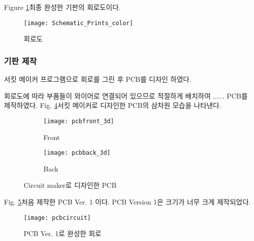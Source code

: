 Figure \ref{fig:Schematic_Prints}\는 최종 완성한 기판의 회로도이다.
\begin{figure}
	\begin{center}
	\texttt{[image: Schematic\_Prints\_color]}
	\caption{회로도}
	\label{fig:Schematic_Prints}
	\end{center}
\end{figure}


\subsubsection{기판 제작}
서킷 메이커 프로그램으로 회로를 그린 후 PCB를 디자인 하였다. 


회로도에 따라 부품들이 와이어로 연결되어 있으므로 적절하게 배치하여 ......    PCB를 제작하였다. Fig. \ref{fig:pcb}\은 서킷 메이커로 디자인한 PCB의 삼차원 모습을 나타낸다.

\begin{figure}[h]
	\begin{center}
	\begin{subfigure}{0.45\textwidth}
		\texttt{[image: pcbfront\_3d]} 
		\caption{Front}
		\label{fig:pcbfront_3d}
	\end{subfigure}
	\begin{subfigure}{0.45\textwidth}
		\texttt{[image: pcbback\_3d]}
		\caption{Back}
		\label{fig:pcbback_3d}
	\end{subfigure}
	\caption{Circuit maker로 디자인한 PCB}
	\label{fig:pcb}
	\end{center}
\end{figure}

Fig. \ref{fig:pcbcircuit}\은 처음 제작한 PCB Ver. 1 이다. PCB Version 1은 크기가 너무 크게 제작되었다.
\begin{figure}[H]
	\begin{center}
		\texttt{[image: pcbcircuit]}
		\caption{PCB Ver. 1로 완성한 회로}
		\label{fig:pcbcircuit}
	\end{center}
\end{figure}




